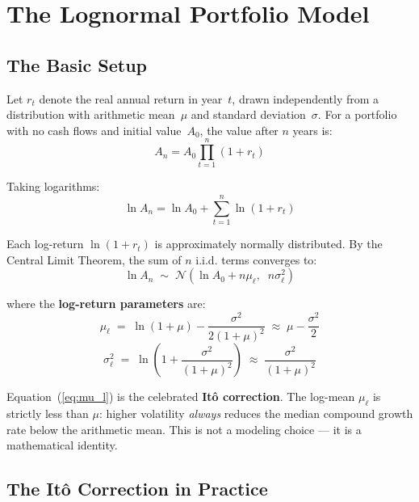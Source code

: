 \documentclass[11pt,letterpaper]{article}
\begin{document}
\section{The Lognormal Portfolio Model}

\subsection{The Basic Setup}

Let $r_t$ denote the real annual return in year~$t$, drawn independently from a distribution with arithmetic mean~$\mu$ and standard deviation~$\sigma$. For a portfolio with no cash flows and initial value~$A_0$, the value after $n$ years is:
\begin{equation}
A_n = A_0 \prod_{t=1}^{n} (1 + r_t)
\end{equation}

Taking logarithms:
\begin{equation}
\ln A_n = \ln A_0 + \sum_{t=1}^{n} \ln(1 + r_t)
\end{equation}

Each log-return $\ln(1+r_t)$ is approximately normally distributed. By the Central Limit Theorem, the sum of $n$ i.i.d. terms converges to:
\begin{equation}
\ln A_n \;\sim\; \mathcal{N}\!\left(\ln A_0 + n\mu_\ell,\;\; n\sigma_\ell^2\right)
\end{equation}

where the \textbf{log-return parameters} are:
\begin{equation}
\mu_\ell \;=\; \ln(1+\mu) - \frac{\sigma^2}{2(1+\mu)^2} \;\approx\; \mu - \frac{\sigma^2}{2}
\label{eq:mu_l}
\end{equation}
\begin{equation}
\sigma_\ell^2 \;=\; \ln\!\left(1 + \frac{\sigma^2}{(1+\mu)^2}\right) \;\approx\; \frac{\sigma^2}{(1+\mu)^2}
\label{eq:sigma_l}
\end{equation}

Equation~(\ref{eq:mu_l}) is the celebrated \textbf{It\^{o} correction}. The log-mean $\mu_\ell$ is strictly less than $\mu$: higher volatility \emph{always} reduces the median compound growth rate below the arithmetic mean. This is not a modeling choice --- it is a mathematical identity.

\subsection{The It\^{o} Correction in Practice}
\end{document}
